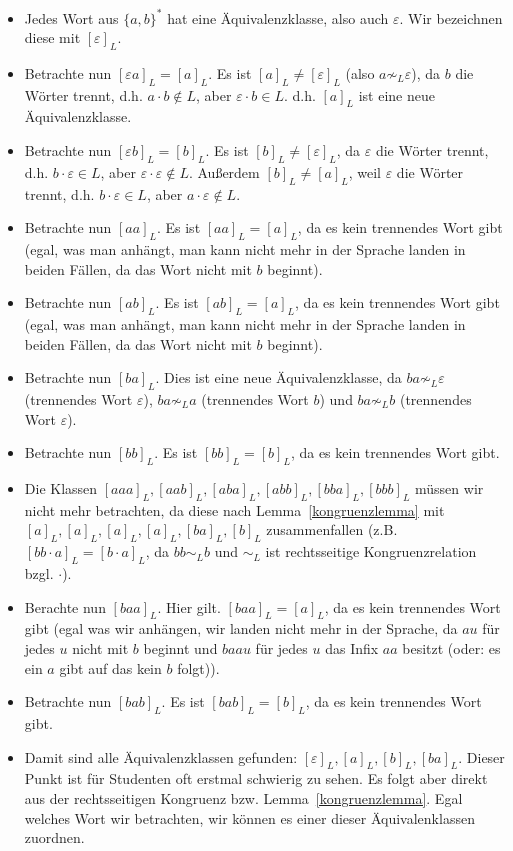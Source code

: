 \documentclass[11pt, a4paper]{article}
\theoremstyle{definition}
\theoremstyle{plain}
\begin{document}
\begin{itemize}
	\item Jedes Wort aus \( \{ a, b \}^\ast \) hat eine Äquivalenzklasse, also auch \( \varepsilon \). Wir bezeichnen diese mit \( [\varepsilon]_L \).
	\item Betrachte nun \( [\varepsilon a]_L = [a]_L \). Es ist \( [a]_L \neq [\varepsilon]_L \) (also \( a \not\sim_L \varepsilon \)), da \( b \) die Wörter trennt, d.h. \( a \cdot b \notin L \), aber \( \varepsilon \cdot b \in L \). d.h. \( [a]_L \) ist eine neue Äquivalenzklasse.
	\item Betrachte nun \( [\varepsilon b]_L = [b]_L \). Es ist \( [b]_L \neq [\varepsilon]_L \), da \( \varepsilon \) die Wörter trennt, d.h. \( b \cdot \varepsilon \in L \), aber \( \varepsilon \cdot \varepsilon \notin L \). Außerdem \( [b]_L \neq [a]_L \), weil \( \varepsilon \) die Wörter trennt, d.h. \( b \cdot \varepsilon \in L \), aber \( a \cdot \varepsilon \notin L \).
	\item Betrachte nun \( [aa]_L \). Es ist \( [aa]_L = [a]_L \), da es kein trennendes Wort gibt (egal, was man anhängt, man kann nicht mehr in der Sprache landen in beiden Fällen, da das Wort nicht mit \( b \) beginnt).
	\item Betrachte nun \( [ab]_L \). Es ist \( [ab]_L = [a]_L \), da es kein trennendes Wort gibt (egal, was man anhängt, man kann nicht mehr in der Sprache landen in beiden Fällen, da das Wort nicht mit \( b \) beginnt).
	\item Betrachte nun \( [ba]_L \). Dies ist eine neue Äquivalenzklasse, da \( ba \not\sim_L \varepsilon \) (trennendes Wort \( \varepsilon \)), \( ba \not\sim_L a \) (trennendes Wort \( b \)) und \( ba \not\sim_L b \) (trennendes Wort \( \varepsilon \)).
	\item Betrachte nun \( [bb]_L \). Es ist \( [bb]_L = [b]_L \), da es kein trennendes Wort gibt.
	\item Die Klassen \( [aaa]_L, [aab]_L, [aba]_L, [abb]_L, [bba]_L, [bbb]_L \) müssen wir nicht mehr betrachten, da diese nach Lemma~\ref{kongruenzlemma} mit \( [a]_L, [a]_L, [a]_L, [a]_L, [ba]_L, [b]_L \) zusammenfallen (z.B. \( [bb \cdot a]_L = [b \cdot a]_L \), da \( bb \sim_L b \) und \( \sim_L \) ist rechtsseitige Kongruenzrelation bzgl. \( \cdot \)).
	\item Berachte nun \( [baa]_L \). Hier gilt. \( [baa]_L = [a]_L \), da es kein trennendes Wort gibt (egal was wir anhängen, wir landen nicht mehr in der Sprache, da \( au \) für jedes \( u \) nicht mit \( b \) beginnt und \( baau \) für jedes \( u \) das Infix \( aa \) besitzt (oder: es ein \( a \) gibt auf das kein \( b \) folgt)).
	\item Betrachte nun \( [bab]_L \). Es ist \( [bab]_L = [b]_L \), da es kein trennendes Wort gibt.
	\item Damit sind alle Äquivalenzklassen gefunden: \( [\varepsilon]_L, [a]_L, [b]_L, [ba]_L \). Dieser Punkt ist für Studenten oft erstmal schwierig zu sehen. Es folgt aber direkt aus der rechtsseitigen Kongruenz bzw. Lemma~\ref{kongruenzlemma}. Egal welches Wort wir betrachten, wir können es einer dieser Äquivalenklassen zuordnen.
\end{itemize}
\end{document}
